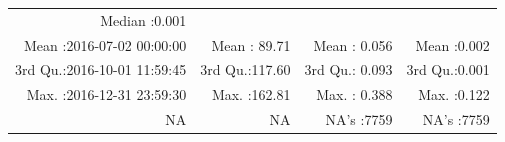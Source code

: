 \documentclass[
  10pt,
  a4paper,oneside]{article}
\begin{document}
\begin{longtable}[]{@{}rrrr@{}}
\begin{minipage}[t]{0.19\columnwidth}
Median :0.001\strut
\end{minipage}\tabularnewline
\begin{minipage}[t]{0.33\columnwidth}\raggedleft
Mean :2016-07-02 00:00:00\strut
\end{minipage} & \begin{minipage}[t]{0.19\columnwidth}\raggedleft
Mean : 89.71\strut
\end{minipage} & \begin{minipage}[t]{0.19\columnwidth}\raggedleft
Mean : 0.056\strut
\end{minipage} & \begin{minipage}[t]{0.19\columnwidth}\raggedleft
Mean :0.002\strut
\end{minipage}\tabularnewline
\begin{minipage}[t]{0.33\columnwidth}\raggedleft
3rd Qu.:2016-10-01 11:59:45\strut
\end{minipage} & \begin{minipage}[t]{0.19\columnwidth}\raggedleft
3rd Qu.:117.60\strut
\end{minipage} & \begin{minipage}[t]{0.19\columnwidth}\raggedleft
3rd Qu.: 0.093\strut
\end{minipage} & \begin{minipage}[t]{0.19\columnwidth}\raggedleft
3rd Qu.:0.001\strut
\end{minipage}\tabularnewline
\begin{minipage}[t]{0.33\columnwidth}\raggedleft
Max. :2016-12-31 23:59:30\strut
\end{minipage} & \begin{minipage}[t]{0.19\columnwidth}\raggedleft
Max. :162.81\strut
\end{minipage} & \begin{minipage}[t]{0.19\columnwidth}\raggedleft
Max. : 0.388\strut
\end{minipage} & \begin{minipage}[t]{0.19\columnwidth}\raggedleft
Max. :0.122\strut
\end{minipage}\tabularnewline
\begin{minipage}[t]{0.33\columnwidth}\raggedleft
NA\strut
\end{minipage} & \begin{minipage}[t]{0.19\columnwidth}\raggedleft
NA\strut
\end{minipage} & \begin{minipage}[t]{0.19\columnwidth}\raggedleft
NA's :7759\strut
\end{minipage} & \begin{minipage}[t]{0.19\columnwidth}\raggedleft
NA's :7759\strut
\end{minipage}\tabularnewline
\bottomrule
\end{longtable}
\end{document}
